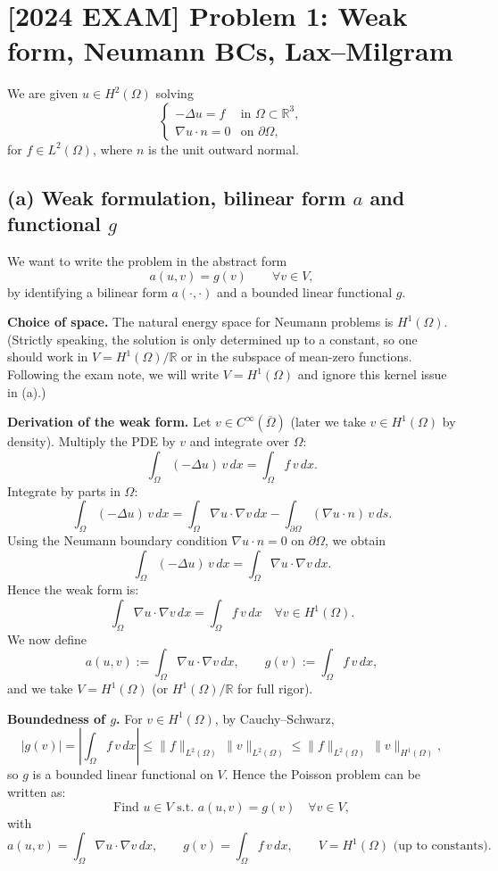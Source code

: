 \section*{[2024 EXAM] Problem 1: Weak form, Neumann BCs, Lax--Milgram}
We are given $u \in H^2(\Omega)$ solving
\[
  \begin{cases}
    - \Delta u = f       & \text{in } \Omega \subset \mathbb{R}^3, \\
    \nabla u \cdot n = 0 & \text{on } \partial\Omega,
  \end{cases}
\]
for $f \in L^2(\Omega)$, where $n$ is the unit outward normal.
\subsection*{(a) Weak formulation, bilinear form $a$ and functional $g$}
We want to write the problem in the abstract form
\[
  a(u,v) = g(v) \qquad \forall v \in V,
\]
by identifying a bilinear form $a(\cdot,\cdot)$ and a bounded linear functional $g$.

\textbf{Choice of space.}
The natural energy space for Neumann problems is $H^1(\Omega)$.
(Strictly speaking, the solution is only determined up to a constant, so one should work
in $V = H^1(\Omega)/\mathbb{R}$ or in the subspace of mean-zero functions.
Following the exam note, we will write $V = H^1(\Omega)$ and ignore this kernel issue in (a).)

\textbf{Derivation of the weak form.}
Let $v \in C^\infty(\overline{\Omega})$ (later we take $v \in H^1(\Omega)$ by density).
Multiply the PDE by $v$ and integrate over $\Omega$:
\[
  \int_\Omega (-\Delta u)\, v \,dx = \int_\Omega f\,v\,dx.
\]
Integrate by parts in $\Omega$:
\[
  \int_\Omega (-\Delta u)\, v \,dx
  = \int_\Omega \nabla u \cdot \nabla v \,dx
  - \int_{\partial\Omega} (\nabla u \cdot n)\, v \,ds.
\]
Using the Neumann boundary condition $\nabla u \cdot n = 0$ on $\partial\Omega$, we obtain
\[
  \int_\Omega (-\Delta u)\, v \,dx
  = \int_\Omega \nabla u \cdot \nabla v \,dx.
\]
Hence the weak form is:
\[
  \int_\Omega \nabla u \cdot \nabla v \,dx
  = \int_\Omega f\,v\,dx
  \quad\forall v \in H^1(\Omega).
\]
We now define
\[
  a(u,v) := \int_\Omega \nabla u \cdot \nabla v \,dx,\qquad
  g(v) := \int_\Omega f\,v\,dx,
\]
and we take $V = H^1(\Omega)$ (or $H^1(\Omega)/\mathbb{R}$ for full rigor).

\textbf{Boundedness of $g$.}
For $v \in H^1(\Omega)$, by Cauchy--Schwarz,
\[
  |g(v)| = \left|\int_\Omega f\,v\,dx\right|
  \le \|f\|_{L^2(\Omega)}\,\|v\|_{L^2(\Omega)}
  \le \|f\|_{L^2(\Omega)}\,\|v\|_{H^1(\Omega)},
\]
so $g$ is a bounded linear functional on $V$.
Hence the Poisson problem can be written as:
\[
  \boxed{
    \text{Find } u \in V \text{ s.t. } a(u,v) = g(v)\quad\forall v \in V,
  }
\]
with
\[
  a(u,v) = \int_\Omega \nabla u \cdot \nabla v\,dx,\qquad
  g(v) = \int_\Omega f\,v\,dx,\qquad V = H^1(\Omega)
  \text{ (up to constants)}.
\]


